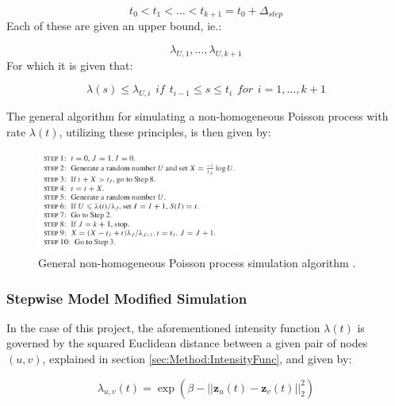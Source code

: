 \begin{equation}
    t_0 < t_1 < \dots < t_{k+1} = t_0 + \Delta_{step}
\end{equation}
Each of these are given an upper bound, ie.:

\begin{equation}
    \lambda_{U,1}, \dots, \lambda_{U,k+1}
\end{equation}
For which it is given that:

\begin{equation}
    \lambda(s) \leq \lambda_{U,i} \hspace{5pt} if \hspace{5pt} t_{i-1} \leq s \leq t_i \hspace{5pt} for \hspace{5pt} i = 1,\dots,k+1
\end{equation}

The general algorithm for simulating a non-homogeneous Poisson process with rate $\lambda(t)$, utilizing these principles, is then given by:

\begin{figure}[H]
    \centering
    \includegraphics[width=0.6\textwidth]{0_images/nonHomogeneousAlgorithm.png}
    \caption{General non-homogeneous Poisson process simulation algorithm \cite{Ross2013GeneratingVariables}.}
    \label{fig:NonHomogeneousGeneralAlgorithm}
\end{figure}


\subsubsection{Stepwise Model Modified Simulation}
\label{sec:Method:PoissonSimulation:NonHomogeneousModified}
In the case of this project, the aforementioned intensity function $\lambda(t)$ is governed by the squared Euclidean distance between a given pair of nodes $(u,v)$, explained in section \ref{sec:Method:IntensityFunc}, and given by:

\begin{equation}
    \lambda_{u,v}(t)
    =
    \exp \left(\beta - ||\textbf{z}_u(t) - \textbf{z}_v(t)||_2^2\right)
    \label{eq:IntensityFunc2}
\end{equation}

